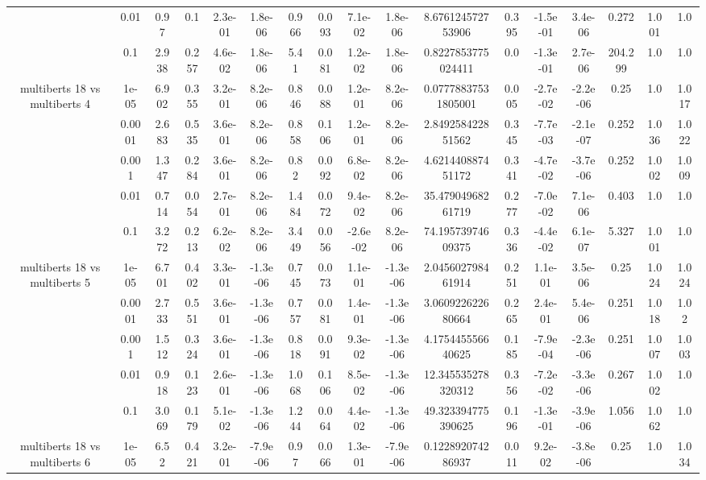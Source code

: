\begin{tabular}{|c|c|c|c|c|c|c|c|c|c|c|c|c|c|c|c|c|}
 & 0.01 & 0.97 & 0.1 & 2.3e-01 & 1.8e-06 & 0.966 & 0.093 & 7.1e-02 & 1.8e-06 & 8.676124572753906 & 0.395 & -1.5e-01 & 3.4e-06 & 0.272 & 1.001 & 1.0 \\
 & 0.1 & 2.938 & 0.257 & 4.6e-02 & 1.8e-06 & 5.41 & 0.081 & 1.2e-02 & 1.8e-06 & 0.8227853775024411 & 0.0 & -1.3e-01 & 2.7e-06 & 204.299 & 1.0 & 1.0 \\
\hline
\multirow{5}{*}{multiberts 18 vs multiberts 4} & 1e-05 & 6.902 & 0.355 & 3.2e-01 & 8.2e-06 & 0.846 & 0.088 & 1.2e-01 & 8.2e-06 & 0.07778837531805001 & 0.005 & -2.7e-02 & -2.2e-06 & 0.25 & 1.0 & 1.017 \\
 & 0.0001 & 2.683 & 0.535 & 3.6e-01 & 8.2e-06 & 0.858 & 0.106 & 1.2e-01 & 8.2e-06 & 2.849258422851562 & 0.345 & -7.7e-03 & -2.1e-07 & 0.252 & 1.036 & 1.022 \\
 & 0.001 & 1.347 & 0.284 & 3.6e-01 & 8.2e-06 & 0.82 & 0.092 & 6.8e-02 & 8.2e-06 & 4.621440887451172 & 0.341 & -4.7e-02 & -3.7e-06 & 0.252 & 1.002 & 1.009 \\
 & 0.01 & 0.714 & 0.054 & 2.7e-01 & 8.2e-06 & 1.484 & 0.072 & 9.4e-02 & 8.2e-06 & 35.47904968261719 & 0.277 & -7.0e-02 & 7.1e-06 & 0.403 & 1.0 & 1.0 \\
 & 0.1 & 3.272 & 0.213 & 6.2e-02 & 8.2e-06 & 3.449 & 0.056 & -2.6e-02 & 8.2e-06 & 74.19573974609375 & 0.336 & -4.4e-02 & 6.1e-07 & 5.327 & 1.001 & 1.0 \\
\hline
\multirow{5}{*}{multiberts 18 vs multiberts 5} & 1e-05 & 6.701 & 0.402 & 3.3e-01 & -1.3e-06 & 0.745 & 0.073 & 1.1e-01 & -1.3e-06 & 2.045602798461914 & 0.251 & 1.1e-01 & 3.5e-06 & 0.25 & 1.024 & 1.024 \\
 & 0.0001 & 2.733 & 0.551 & 3.6e-01 & -1.3e-06 & 0.757 & 0.081 & 1.4e-01 & -1.3e-06 & 3.060922622680664 & 0.265 & 2.4e-01 & 5.4e-06 & 0.251 & 1.018 & 1.02 \\
 & 0.001 & 1.512 & 0.324 & 3.6e-01 & -1.3e-06 & 0.818 & 0.091 & 9.3e-02 & -1.3e-06 & 4.175445556640625 & 0.185 & -7.9e-04 & -2.3e-06 & 0.251 & 1.007 & 1.003 \\
 & 0.01 & 0.918 & 0.123 & 2.6e-01 & -1.3e-06 & 1.068 & 0.106 & 8.5e-02 & -1.3e-06 & 12.345535278320312 & 0.356 & -7.2e-02 & -3.3e-06 & 0.267 & 1.002 & 1.0 \\
 & 0.1 & 3.069 & 0.179 & 5.1e-02 & -1.3e-06 & 1.244 & 0.064 & 4.4e-02 & -1.3e-06 & 49.323394775390625 & 0.196 & -1.3e-01 & -3.9e-06 & 1.056 & 1.062 & 1.0 \\
\hline
\multirow{5}{*}{multiberts 18 vs multiberts 6} & 1e-05 & 6.52 & 0.421 & 3.2e-01 & -7.9e-06 & 0.97 & 0.066 & 1.3e-01 & -7.9e-06 & 0.122892074286937 & 0.011 & 9.2e-02 & -3.8e-06 & 0.25 & 1.0 & 1.034 \\

\end{tabular}

